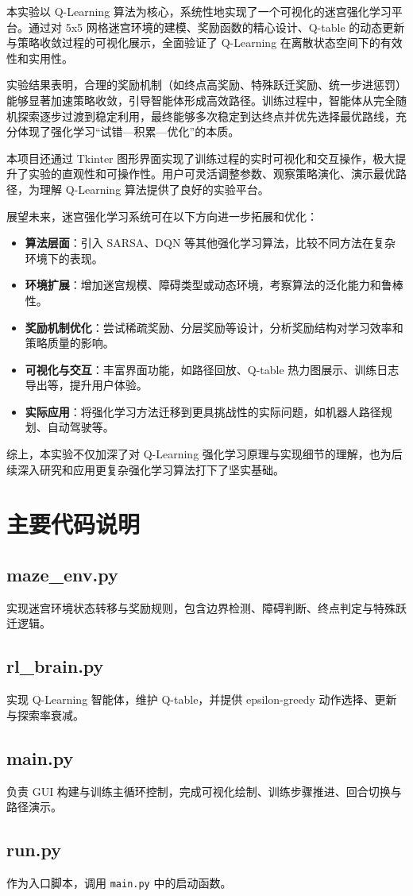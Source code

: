 \documentclass[UTF8, a4paper, 12pt]{ctexart}
\begin{document}
本实验以 Q-Learning 算法为核心，系统性地实现了一个可视化的迷宫强化学习平台。通过对 5x5 网格迷宫环境的建模、奖励函数的精心设计、Q-table 的动态更新与策略收敛过程的可视化展示，全面验证了 Q-Learning 在离散状态空间下的有效性和实用性。

实验结果表明，合理的奖励机制（如终点高奖励、特殊跃迁奖励、统一步进惩罚）能够显著加速策略收敛，引导智能体形成高效路径。训练过程中，智能体从完全随机探索逐步过渡到稳定利用，最终能够多次稳定到达终点并优先选择最优路线，充分体现了强化学习“试错—积累—优化”的本质。

本项目还通过 Tkinter 图形界面实现了训练过程的实时可视化和交互操作，极大提升了实验的直观性和可操作性。用户可灵活调整参数、观察策略演化、演示最优路径，为理解 Q-Learning 算法提供了良好的实验平台。

展望未来，迷宫强化学习系统可在以下方向进一步拓展和优化：
\begin{itemize}
  \item \textbf{算法层面}：引入 SARSA、DQN 等其他强化学习算法，比较不同方法在复杂环境下的表现。
  \item \textbf{环境扩展}：增加迷宫规模、障碍类型或动态环境，考察算法的泛化能力和鲁棒性。
  \item \textbf{奖励机制优化}：尝试稀疏奖励、分层奖励等设计，分析奖励结构对学习效率和策略质量的影响。
  \item \textbf{可视化与交互}：丰富界面功能，如路径回放、Q-table 热力图展示、训练日志导出等，提升用户体验。
  \item \textbf{实际应用}：将强化学习方法迁移到更具挑战性的实际问题，如机器人路径规划、自动驾驶等。
\end{itemize}

综上，本实验不仅加深了对 Q-Learning 强化学习原理与实现细节的理解，也为后续深入研究和应用更复杂强化学习算法打下了坚实基础。

\section{主要代码说明}

\subsection{maze\_env.py}
实现迷宫环境状态转移与奖励规则，包含边界检测、障碍判断、终点判定与特殊跃迁逻辑。

\subsection{rl\_brain.py}
实现 Q-Learning 智能体，维护 Q-table，并提供 epsilon-greedy 动作选择、更新与探索率衰减。

\subsection{main.py}
负责 GUI 构建与训练主循环控制，完成可视化绘制、训练步骤推进、回合切换与路径演示。

\subsection{run.py}
作为入口脚本，调用 \texttt{main.py} 中的启动函数。
\end{document}
